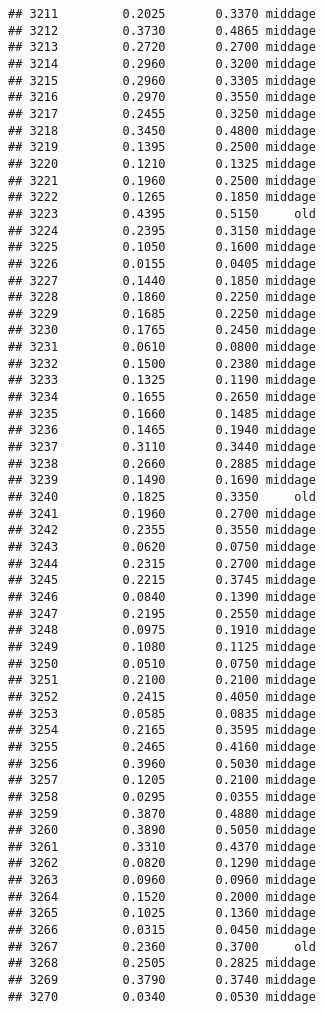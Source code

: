 \documentclass[
]{article}
\begin{document}
\begin{verbatim}
## 3211         0.2025       0.3370 middage
## 3212         0.3730       0.4865 middage
## 3213         0.2720       0.2700 middage
## 3214         0.2960       0.3200 middage
## 3215         0.2960       0.3305 middage
## 3216         0.2970       0.3550 middage
## 3217         0.2455       0.3250 middage
## 3218         0.3450       0.4800 middage
## 3219         0.1395       0.2500 middage
## 3220         0.1210       0.1325 middage
## 3221         0.1960       0.2500 middage
## 3222         0.1265       0.1850 middage
## 3223         0.4395       0.5150     old
## 3224         0.2395       0.3150 middage
## 3225         0.1050       0.1600 middage
## 3226         0.0155       0.0405 middage
## 3227         0.1440       0.1850 middage
## 3228         0.1860       0.2250 middage
## 3229         0.1685       0.2250 middage
## 3230         0.1765       0.2450 middage
## 3231         0.0610       0.0800 middage
## 3232         0.1500       0.2380 middage
## 3233         0.1325       0.1190 middage
## 3234         0.1655       0.2650 middage
## 3235         0.1660       0.1485 middage
## 3236         0.1465       0.1940 middage
## 3237         0.3110       0.3440 middage
## 3238         0.2660       0.2885 middage
## 3239         0.1490       0.1690 middage
## 3240         0.1825       0.3350     old
## 3241         0.1960       0.2700 middage
## 3242         0.2355       0.3550 middage
## 3243         0.0620       0.0750 middage
## 3244         0.2315       0.2700 middage
## 3245         0.2215       0.3745 middage
## 3246         0.0840       0.1390 middage
## 3247         0.2195       0.2550 middage
## 3248         0.0975       0.1910 middage
## 3249         0.1080       0.1125 middage
## 3250         0.0510       0.0750 middage
## 3251         0.2100       0.2100 middage
## 3252         0.2415       0.4050 middage
## 3253         0.0585       0.0835 middage
## 3254         0.2165       0.3595 middage
## 3255         0.2465       0.4160 middage
## 3256         0.3960       0.5030 middage
## 3257         0.1205       0.2100 middage
## 3258         0.0295       0.0355 middage
## 3259         0.3870       0.4880 middage
## 3260         0.3890       0.5050 middage
## 3261         0.3310       0.4370 middage
## 3262         0.0820       0.1290 middage
## 3263         0.0960       0.0960 middage
## 3264         0.1520       0.2000 middage
## 3265         0.1025       0.1360 middage
## 3266         0.0315       0.0450 middage
## 3267         0.2360       0.3700     old
## 3268         0.2505       0.2825 middage
## 3269         0.3790       0.3740 middage
## 3270         0.0340       0.0530 middage

\end{verbatim}
\end{document}
